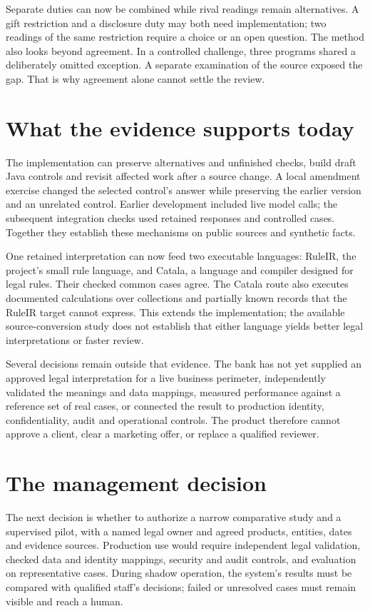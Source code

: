 \documentclass[12pt,a4paper,oneside,openany]{book}
\begin{document}
Separate duties can now be combined while rival readings remain alternatives.
A gift restriction and a disclosure duty may both need implementation; two
readings of the same restriction require a choice or an open question. The
method also looks beyond agreement. In a controlled challenge, three programs
shared a deliberately omitted exception. A separate examination of the source
exposed the gap. That is why agreement alone cannot settle the review.

\section*{What the evidence supports today}

The implementation can preserve alternatives and unfinished checks, build draft
Java controls and revisit affected work after a source change. A local amendment
exercise changed the selected control's answer while preserving the earlier
version and an unrelated control. Earlier development included live model calls;
the subsequent integration checks used retained responses and controlled cases.
Together they establish these mechanisms on public sources and synthetic facts.

One retained interpretation can now feed two executable languages: RuleIR, the
project's small rule language, and Catala, a language and compiler designed for
legal rules. Their checked common cases agree. The Catala route also executes
documented calculations over collections and partially known records that the
RuleIR target cannot express. This extends the implementation; the available
source-conversion study does not establish that either language yields better
legal interpretations or faster review.

Several decisions remain outside that evidence. The bank has not yet supplied
an approved legal interpretation for a live business perimeter, independently
validated the meanings and data mappings, measured performance against a
reference set of real cases, or connected the result to production identity,
confidentiality, audit and operational controls. The product therefore cannot
approve a client, clear a marketing offer, or replace a qualified reviewer.

\section*{The management decision}

The next decision is whether to authorize a narrow comparative study and a
supervised pilot, with a named legal owner and agreed products, entities, dates
and evidence sources. Production use would require independent legal validation,
checked data and identity mappings, security and audit controls, and evaluation
on representative cases. During shadow operation, the system's results must be
compared with qualified staff's decisions; failed or unresolved cases must remain
visible and reach a human.
\end{document}
